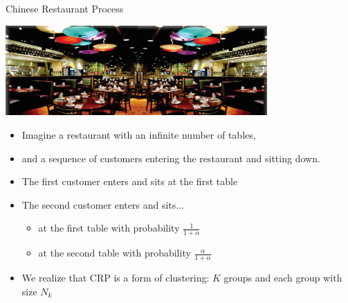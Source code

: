 \documentclass[xcolor={x11names,svgnames,dvipsnames},trans]{beamer}
\begin{document}
\begin{frame}{Chinese Restaurant Process}

    {\centering
    \includegraphics[width=0.75\textwidth]{images/crp.png}\par
    }

    \pause

    \begin{itemize}
        \item Imagine a restaurant with an infinite number of tables,
        \item and a sequence of customers entering the restaurant and sitting down.
        \item The first customer enters and sits at the first table
        \item The second customer enters and sits...
            \begin{itemize}
                \item at the first table with probability $\frac{1}{1 + \alpha}$
                \item at the second table with probability $\frac{\alpha}{1 + \alpha}$
            \end{itemize}
        \item We realize that CRP is a form of clustering: $K$ groups and each group with size $N_k$
    \end{itemize}
\end{frame}
\end{document}
